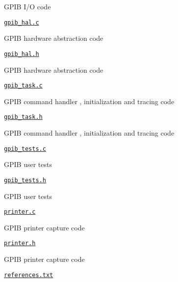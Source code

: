 \begin{DoxyItemize}
\begin{DoxyItemize}
\begin{DoxyItemize}
\item G\+P\+IB I/O code
\end{DoxyItemize}
\item \href{gpib/gpib_hal.c}{\tt gpib\+\_\+hal.\+c}
\begin{DoxyItemize}
\item G\+P\+IB hardware abstraction code
\end{DoxyItemize}
\item \href{gpib/gpib_hal.h}{\tt gpib\+\_\+hal.\+h}
\begin{DoxyItemize}
\item G\+P\+IB hardware abstraction code
\end{DoxyItemize}
\item \href{gpib/gpib_task.c}{\tt gpib\+\_\+task.\+c}
\begin{DoxyItemize}
\item G\+P\+IB command handler , initialization and tracing code
\end{DoxyItemize}
\item \href{gpib/gpib_task.h}{\tt gpib\+\_\+task.\+h}
\begin{DoxyItemize}
\item G\+P\+IB command handler , initialization and tracing code
\end{DoxyItemize}
\item \href{gpib/gpib_tests.c}{\tt gpib\+\_\+tests.\+c}
\begin{DoxyItemize}
\item G\+P\+IB user tests
\end{DoxyItemize}
\item \href{gpib/gpib_tests.h}{\tt gpib\+\_\+tests.\+h}
\begin{DoxyItemize}
\item G\+P\+IB user tests
\end{DoxyItemize}
\item \href{gpib/printer.c}{\tt printer.\+c}
\begin{DoxyItemize}
\item G\+P\+IB printer capture code
\end{DoxyItemize}
\item \href{gpib/printer.h}{\tt printer.\+h}
\begin{DoxyItemize}
\item G\+P\+IB printer capture code
\end{DoxyItemize}
\item \href{gpib/references.txt}{\tt references.\+txt}

\end{DoxyItemize}
\end{DoxyItemize}
